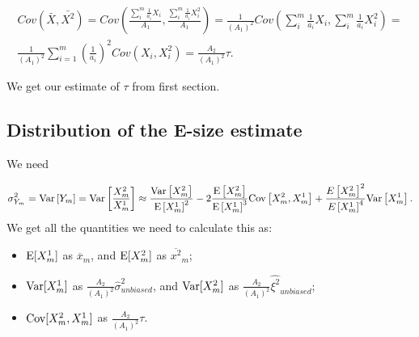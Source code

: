\documentclass{article}
\begin{document}
\begin{multline}
	Cov(\bar{X}, \bar{X^2} ) = Cov(\frac{\sum_{i}^m \frac{1}{a_i}X_i}{A_1}, \frac{\sum_{i}^m \frac{1}{a_i}X_i^2}{A_1}) = \frac{1}{(A_1)^2} Cov(\sum_{i}^m \frac{1}{a_i}X_i, \sum_{i}^m \frac{1}{a_i}X^2_i) = \\ \frac{1}{(A_1)^2} \sum_{i=1}^m (\frac{1}{a_i})^2 Cov(X_i, X^2_i) = \frac{A_2}{(A_1)^2} \tau. 
\end{multline}

We get our estimate of $\tau$ from first section.

\subsection{Distribution of the E-size estimate}
\label{ssec:another_subtitle}

We need 

\[\sigma_{Y_m}^2 = \text{Var}\left[Y_m\right] = \text{Var}\left[\frac{X^2_m}{X^1_m}\right] \approx \frac{\text{Var}\left[X^2_m\right]}{\text{E}\left[X^1_m\right]^2} -2\frac{\text{E}\left[X^2_m\right]}{\text{E}\left[X^1_m\right]^3}\text{Cov}\left[X^2_m,X^1_m\right] + \frac{E\left[X^2_m\right]^2}{E\left[X^1_m\right]^4}\text{Var}\left[X^1_m\right].\] 
We get all the quantities we need to calculate this as:

\begin{itemize}
\item $\text{E}[X^1_m]$ as $\overline{x}_m$, and $\text{E}[X^2_m]$ as $\overline{x^2}_m$;
\item $\text{Var}[X^1_m]$ as $\frac{A_2}{(A_1)^2}  \hat{\sigma}^2_{unbiased}$, and $\text{Var}[X^2_m]$ as $\frac{A_2}{(A_1)^2}  \hat{\xi^2}_{unbiased}$;
\item $\text{Cov}[X^2_m,X^1_m]$ as $ \frac{A_2}{(A_1)^2} \tau$. 
\end{itemize}
\end{document}
